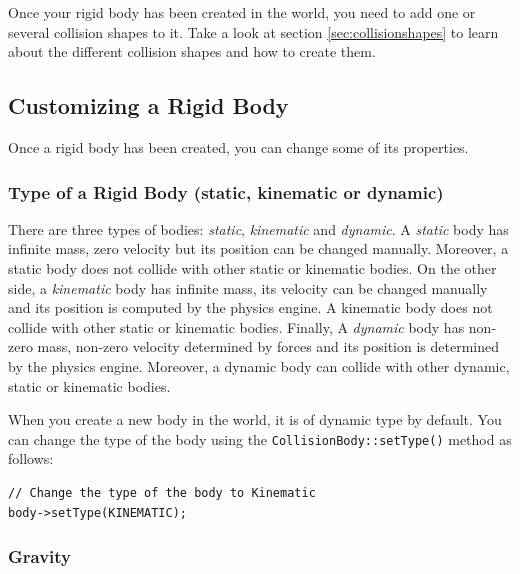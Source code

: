 \documentclass[a4paper,12pt]{article}
\begin{document}
    \vspace{0.6cm}

    Once your rigid body has been created in the world, you need to add one or several collision shapes to it. Take a look at section \ref{sec:collisionshapes} to learn
    about the different collision shapes and how to create them. \\

    \subsection{Customizing a Rigid Body}

    Once a rigid body has been created, you can change some of its properties.

    \subsubsection{Type of a Rigid Body (static, kinematic or dynamic)}

    \begin{sloppypar}
        There are three types of bodies: \emph{static}, \emph{kinematic} and \emph{dynamic}. A \emph{static} body has infinite mass, zero velocity but its position can be
        changed manually. Moreover, a static body does not collide with other static or kinematic bodies. On the other side, a \emph{kinematic} body has infinite mass, its velocity can be
        changed manually and its position is computed by the physics engine. A kinematic body does not collide with other static or kinematic bodies. Finally, A \emph{dynamic} body
        has non-zero mass, non-zero velocity determined by forces and its position is determined by the physics engine. Moreover, a dynamic body can collide with other dynamic, static or
        kinematic bodies. \\
    \end{sloppypar}

    When you create a new body in the world, it is of dynamic type by default. You can change the type of the body using the \texttt{CollisionBody::setType()}
    method as follows:\\

    \begin{lstlisting}
// Change the type of the body to Kinematic
body->setType(KINEMATIC);
  \end{lstlisting}

    \subsubsection{Gravity}
\end{document}
